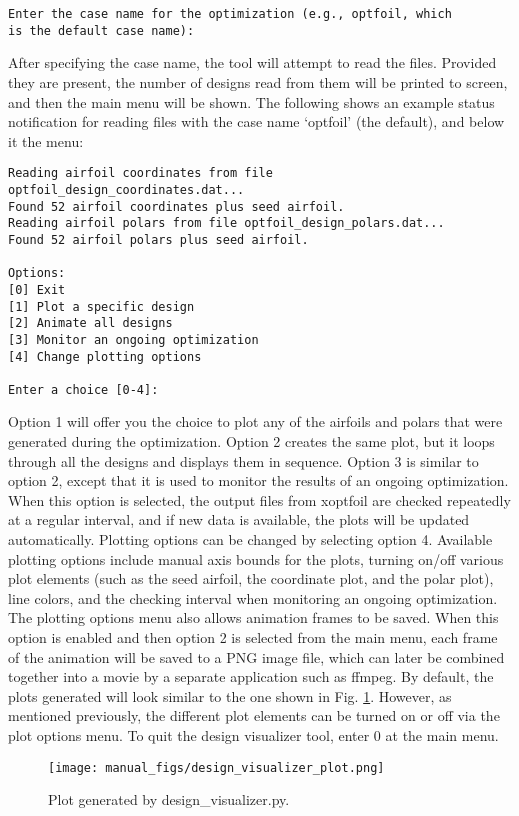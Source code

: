 \documentclass[11pt]{article}
\begin{document}
\begin{verbatim}
Enter the case name for the optimization (e.g., optfoil, which 
is the default case name): 
\end{verbatim}

After specifying the case name, the tool will attempt to read the files.  Provided they
are present, the number of designs read from them will be printed to screen, and then the
main menu will be shown.  The following shows an example status notification for reading
files with the case name `optfoil' (the default), and below it the menu:

\begin{verbatim}
Reading airfoil coordinates from file optfoil_design_coordinates.dat...
Found 52 airfoil coordinates plus seed airfoil.
Reading airfoil polars from file optfoil_design_polars.dat...
Found 52 airfoil polars plus seed airfoil.

Options:
[0] Exit
[1] Plot a specific design
[2] Animate all designs
[3] Monitor an ongoing optimization
[4] Change plotting options

Enter a choice [0-4]: 
\end{verbatim}

Option 1 will offer you the choice to plot any of the airfoils and polars that were
generated during the optimization.  Option 2 creates the same plot, but it loops through
all the designs and displays them in sequence.  Option 3 is similar to option 2, except
that it is used to monitor the results of an ongoing optimization.  When this option is
selected, the output files from xoptfoil are checked repeatedly at a regular interval, and
if new data is available, the plots will be updated automatically. Plotting options can be 
changed by selecting option 4.  Available plotting options include manual axis bounds for 
the plots, turning on/off various plot elements (such as the seed airfoil, the coordinate 
plot, and the polar plot), line colors, and the checking interval when monitoring an
ongoing optimization.  The plotting options menu also allows animation frames to be saved.
When this option is enabled and then option 2 is selected from the main menu, each frame
of the animation will be saved to a PNG image file, which can later be combined together
into a movie by a separate application such as ffmpeg.  By default, the plots generated 
will look similar to the one shown in Fig. \ref{fig:design_visualizer_plot}.  However, as
mentioned previously, the different plot elements can be turned on or off via the plot 
options menu. To quit the design visualizer tool, enter 0 at the main menu.

\begin{figure}
\centering
  \texttt{[image: manual\_figs/design\_visualizer\_plot.png]}
\caption{Plot generated by design\_visualizer.py.}
\label{fig:design_visualizer_plot}
\end{figure}
\end{document}
